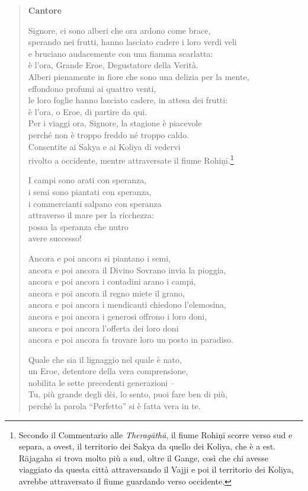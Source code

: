 \begin{quotation}
\textbf{Cantore}


Signore, ci sono alberi che ora ardono come brace, \\
sperando nei frutti, hanno lasciato cadere i loro verdi veli \\
e bruciano audacemente con una fiamma scarlatta: \\
è l’ora, Grande Eroe, Degustatore della Verità. \\
Alberi pienamente in fiore che sono una delizia per la mente, \\
effondono profumi ai quattro venti, \\
le loro foglie hanno lasciato cadere, in attesa dei frutti: \\
è l’ora, o Eroe, di partire da qui. \\
Per i viaggi ora, Signore, la stagione è piacevole \\
perché non è troppo freddo né troppo caldo. \\
Consentite ai Sakya e ai Koliya di vedervi \\
rivolto a occidente, mentre attraversate il fiume
Rohiṇī.\footnote{Secondo il Commentario alle \emph{Theragāthā}, il fiume Rohiṇī scorre verso sud e separa, a ovest, il territorio dei Sakya da quello dei Koliya, che è a est. Rājagaha si trova molto più a sud, oltre il Gange, così che chi avesse viaggiato da questa città attraversando il Vajji e poi il territorio dei Koliya, avrebbe attraversato il fiume guardando verso occidente.}


I campi sono arati con speranza, \\
i semi sono piantati con speranza, \\
i commercianti salpano con speranza \\
attraverso il mare per la ricchezza: \\
possa la speranza che nutro \\
avere successo!


Ancora e poi ancora si piantano i semi, \\
ancora e poi ancora il Divino Sovrano invia la pioggia, \\
ancora e poi ancora i contadini arano i campi, \\
ancora e poi ancora il regno miete il grano, \\
ancora e poi ancora i mendicanti chiedono l’elemosina, \\
ancora e poi ancora i generosi offrono i loro doni, \\
ancora e poi ancora l’offerta dei loro doni \\
ancora e poi ancora fa trovare loro un posto in paradiso.


Quale che sia il lignaggio nel quale è nato, \\
un Eroe, detentore della vera comprensione, \\
nobilita le sette precedenti generazioni – \\
Tu, più grande degli dèi, lo sento, puoi fare ben di più, \\
perché la parola “Perfetto” si è fatta vera in te.
\end{quotation}

